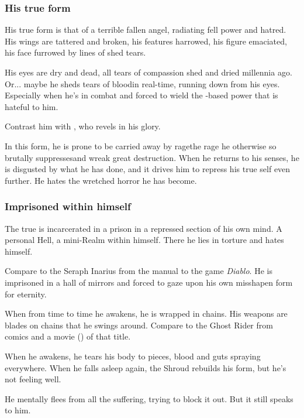 \subsubsection{His true form}
His true form is that of a terrible fallen angel, radiating fell power and hatred. His wings are tattered and broken, his features harrowed, his figure emaciated, his face furrowed by lines of shed tears. 

His eyes are dry and dead, all tears of compassion shed and dried millennia ago. Or... maybe he sheds tears of blood\dash in real-time, running down from his eyes. Especially when he's in combat and forced to wield the \nieur-based power that is hateful to him.

Contrast him with , who revels in his \resphan{} glory.

In this form, he is prone to be carried away by rage\dash the rage he otherwise so brutally suppresses\dash and wreak great destruction. When he returns to his senses, he is disgusted by what he has done, and it drives him to repress his true self even further. He hates the wretched horror he has become. 





\subsubsection{Imprisoned within himself}
The true \Sithiyacaan{} is incarcerated in a prison in a repressed section of his own mind. A personal Hell, a mini-Realm within himself. There he lies in torture and hates himself. 

Compare to the Seraph Inarius from the manual to the game \emph{Diablo}. He is imprisoned in a hall of mirrors and forced to gaze upon his own misshapen form for eternity. 

When from time to time he awakens, he is wrapped in chains. His weapons are blades on chains that he swings around. Compare to the {Ghost Rider} from comics and a movie (\cite{Movie:GhostRider}) of that title. 

When he awakens, he tears his \human{} body to pieces, blood and guts spraying everywhere. When he falls asleep again, the Shroud rebuilds his \human{} form, but he's not feeling well. 

He mentally flees from all the suffering, trying to block it out. 
But it still speaks to him. 


